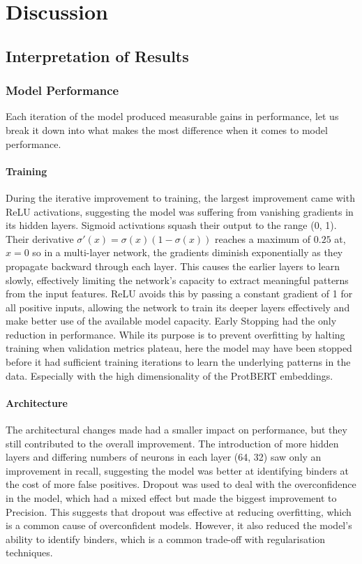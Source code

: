 \chapter{Discussion}

\section{Interpretation of Results}
\subsection{Model Performance}
Each iteration of the model produced measurable gains in performance, let us break it down into what makes the most difference when it comes to model performance.
\subsubsection{Training}
During the iterative improvement to training, the largest improvement came with ReLU activations, suggesting the model was suffering from vanishing gradients in its hidden layers.
Sigmoid activations squash their output to the range (0, 1).
Their derivative $\sigma'(x) = \sigma(x)(1 - \sigma(x))$ reaches a maximum of $0.25$ at, $x = 0$ so in a multi-layer network, the gradients diminish exponentially as they propagate backward through each layer.
This causes the earlier layers to learn slowly, effectively limiting the network's capacity to extract meaningful patterns from the input features.
ReLU avoids this by passing a constant gradient of 1 for all positive inputs, allowing the network to train its deeper layers effectively and make better use of the available model capacity.
Early Stopping had the only reduction in performance.
While its purpose is to prevent overfitting by halting training when validation metrics plateau, here the model may have been stopped before it had sufficient training iterations to learn the underlying patterns in the data.
Especially with the high dimensionality of the ProtBERT embeddings.
\subsubsection{Architecture}
The architectural changes made had a smaller impact on performance, but they still contributed to the overall improvement.
The introduction of more hidden layers and differing numbers of neurons in each layer (64, 32) saw only an improvement in recall, suggesting the model was better at identifying binders at the cost of more false positives.
Dropout was used to deal with the overconfidence in the model, which had a mixed effect but made the biggest improvement to Precision.
This suggests that dropout was effective at reducing overfitting, which is a common cause of overconfident models.
However, it also reduced the model's ability to identify binders, which is a common trade-off with regularisation techniques.
